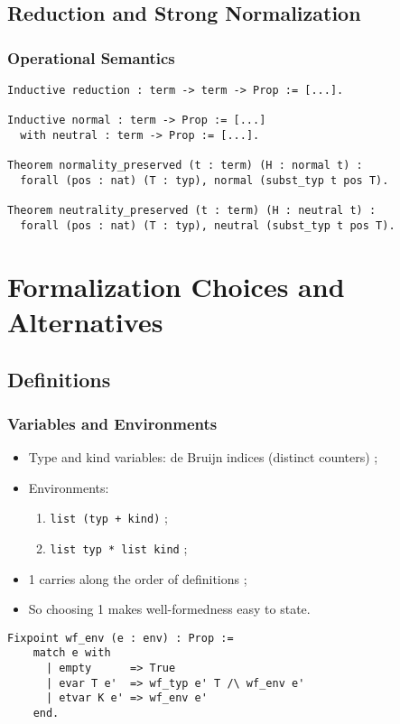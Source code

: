 \documentclass{beamer}
\begin{document}
\subsection{Reduction and Strong Normalization}

\begin{frame}[fragile]

\frametitle{Operational Semantics}

\begin{verbatim}
Inductive reduction : term -> term -> Prop := [...].

Inductive normal : term -> Prop := [...]
  with neutral : term -> Prop := [...].

Theorem normality_preserved (t : term) (H : normal t) :
  forall (pos : nat) (T : typ), normal (subst_typ t pos T).

Theorem neutrality_preserved (t : term) (H : neutral t) :
  forall (pos : nat) (T : typ), neutral (subst_typ t pos T).
\end{verbatim}


\end{frame}

\section{Formalization Choices and Alternatives}

\subsection{Definitions}

\begin{frame}[fragile]

\frametitle{Variables and Environments}

\begin{itemize}
\item Type and kind variables: de Bruijn indices (distinct
  counters) ;
\item Environments:
  \begin{enumerate}
    \item \verb|list (typ + kind)| ;
    \item \verb|list typ * list kind| ;
  \end{enumerate}
\item 1 carries along the order of definitions ;
\item So choosing 1 makes well-formedness easy to state.
\end{itemize}

\begin{verbatim}
Fixpoint wf_env (e : env) : Prop :=
    match e with
      | empty      => True
      | evar T e'  => wf_typ e' T /\ wf_env e'
      | etvar K e' => wf_env e'
    end.
\end{verbatim}

\end{frame}
\end{document}
